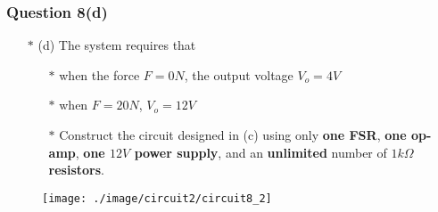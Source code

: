 \documentclass{beamer}
\begin{document}

\begin{frame}
\frametitle{Question 8(d)}
\begin{itemize} \itemsep1pt \parskip0pt 
  \item[$\ast$] (d) The system requires that
  \begin{itemize} \itemsep1pt \parskip0pt 
    \item[$\ast$] when the force $F = 0N$, the output voltage $V_o = 4V$
    \item[$\ast$] when $F = 20N$, $V_o = 12V$
    \item[$\ast$] Construct the circuit designed in (c) using only {\bf one FSR}, {\bf one op-amp}, {\bf one $12V$ power supply}, and an {\bf unlimited} number of $1k\Omega$ {\bf resistors}.
  \end{itemize}
\end{itemize}
\begin{figure}[H]
  \centering
  \texttt{[image: ./image/circuit2/circuit8\_2]}
\end{figure}

\end{frame}

\end{document}
